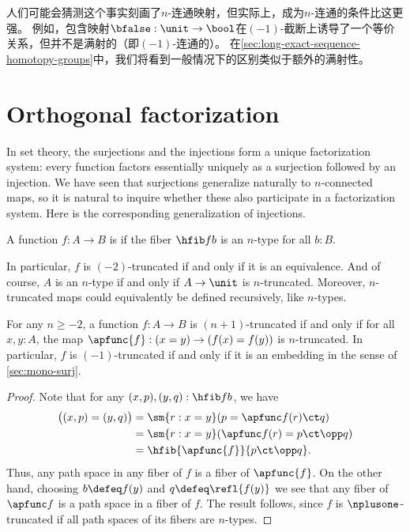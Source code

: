 人们可能会猜测这个事实刻画了$n$-连通映射，但实际上，成为$n$-连通的条件比这更强。
例如，包含映射$\bfalse:\unit \to\bool$在$(-1)$-截断上诱导了一个等价关系，但并不是满射的（即$(-1)$-连通的）。
在\cref{sec:long-exact-sequence-homotopy-groups}中，我们将看到一般情况下的区别类似于额外的满射性。


\section{Orthogonal factorization}
\label{sec:image-factorization}

%
%
In set theory, the surjections and the injections form a unique factorization system: every function factors essentially uniquely as a surjection followed by an injection.
We have seen that surjections generalize naturally to $n$-connected maps, so it is natural to inquire whether these also participate in a factorization system.
Here is the corresponding generalization of injections.

\begin{defn}
  A function $f:A\to B$ is 
if the fiber $\hfib f b$ is an $n$-type for all $b:B$.
\end{defn}

In particular, $f$ is $(-2)$-truncated if and only if it is an equivalence.
And of course, $A$ is an $n$-type if and only if $A\to\unit$ is $n$-truncated.
Moreover, $n$-truncated maps could equivalently be defined recursively, like $n$-types.

\begin{lem}\label{thm:modal-mono}
  For any $n\ge -2$, a function $f:A\to B$ is $(n+1)$-truncated if and only if for all $x,y:A$, the map $\apfunc{f}:(x=y) \to (f(x)=f(y))$ is $n$-truncated.
  In particular, $f$ is $(-1)$-truncated if and only if it is an embedding in the sense of \cref{sec:mono-surj}.
\end{lem}
\begin{proof}
  Note that for any $(x,p),(y,q):\hfib f b$, we have
  \begin{align*}
    \big((x,p) = (y,q)\big)
    &= \sm{r:x=y} (p = \apfunc f(r)\ct q)\\
    &= \sm{r:x=y} (\apfunc f (r) = p\ct \opp q)\\
    &= \hfib{\apfunc{f}}{p\ct \opp q}.
  \end{align*}
  Thus, any path space in any fiber of $f$ is a fiber of $\apfunc{f}$.
  On the other hand, choosing $b\defeq f(y)$ and $q\defeq \refl{f(y)}$ we see that any fiber of $\apfunc f$ is a path space in a fiber of $f$.
  The result follows, since $f$ is $\nplusone$-truncated if all path spaces of its fibers are $n$-types.
\end{proof}

